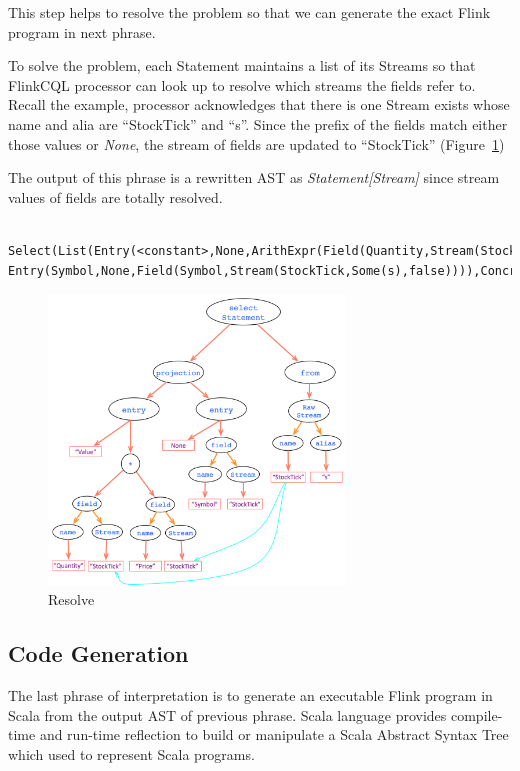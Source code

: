 This step helps to resolve the problem so that we can generate the exact Flink program in next phrase.

To solve the problem, each Statement maintains a list of its Streams so that FlinkCQL processor can look up to resolve which streams the fields refer to. Recall the example, processor acknowledges that there is one Stream exists whose name and alia are ``StockTick'' and ``s''. Since the prefix of the fields match either those values or \textit{None}, the stream of fields are updated to ``StockTick'' (Figure~\ref{fig:Resolve})

The output of this phrase is a rewritten AST as \textit{Statement[Stream]} since stream values of  fields are totally resolved.

\begin{lstlisting}
	Select(List(Entry(<constant>,None,ArithExpr(Field(Quantity,Stream(StockTick,Some(s),false)),*,Field(Price,Stream(StockTick,Some(s),false)))), Entry(Symbol,None,Field(Symbol,Stream(StockTick,Some(s),false)))),ConcreteStream(Stream(StockTick,Some(s),false),None,None),None,None)

\end{lstlisting}

\begin{figure}[h!] 
\centering    
\includegraphics[width=0.7\textwidth]{Resolve}
\caption{Resolve}
\label{fig:Resolve}
\end{figure}


\subsection{Code Generation}
The last phrase of interpretation is to generate an executable Flink program in Scala from the output AST of previous phrase. Scala language provides compile-time and run-time reflection to build or manipulate a Scala Abstract Syntax Tree which used to represent Scala programs. 

